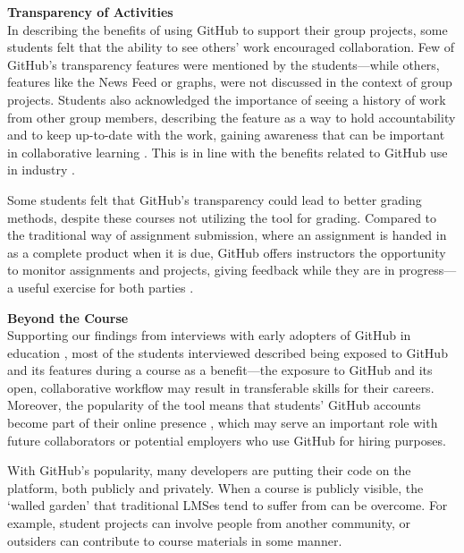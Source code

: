\textbf{Transparency of Activities} \\
In describing the benefits of using GitHub to support their group projects, some students felt that the ability to see others' work encouraged collaboration. Few of GitHub's transparency features were mentioned by the students---while others, features like the News Feed or graphs, were not discussed in the context of group projects. Students also acknowledged the importance of seeing a history of work from other group members, describing the feature as a way to hold accountability and to keep up-to-date with the work, gaining awareness that can be important in collaborative learning \cite{janssen2013coordinated}. This is in line with the benefits related to GitHub use in industry \cite{dabbish2012social}.

Some students felt that GitHub's transparency could lead to better grading methods, despite these courses not utilizing the tool for grading. Compared to the traditional way of assignment submission, where an assignment is handed in as a complete product when it is due, GitHub offers instructors the opportunity to monitor assignments and projects, giving feedback while they are in progress---a useful exercise for both parties \cite{glassy2006using}.

\textbf{Beyond the Course} \\
Supporting our findings from interviews with early adopters of GitHub in education \cite{zagalsky2015emergence}, most of the students interviewed described being exposed to GitHub and its features during a course as a benefit---the exposure to GitHub and its open, collaborative workflow may result in transferable skills for their careers. Moreover, the popularity of the tool means that students' GitHub accounts become part of their online presence \cite{marlow2013impression}, which may serve an important role with future collaborators or potential employers who use GitHub for hiring purposes.

With GitHub's popularity, many developers are putting their code on the platform, both publicly and privately. When a course is publicly visible, the `walled garden' that traditional LMSes tend to suffer from \cite{mott2010envisioning} can be overcome. For example, student projects can involve people from another community, or outsiders can contribute to course materials in some manner. \\

